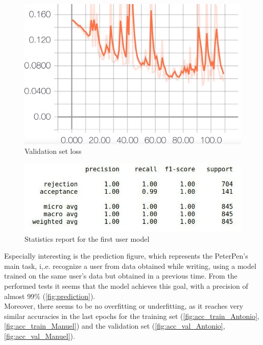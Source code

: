 \documentclass[8pt,notitlepage]{report}
\begin{document}
			\begin{figure}[H]
				\begin{center}
					\includegraphics[scale=.16]{val_loss_Manuel}
					\caption{Validation set loss}
				\end{center}
			\end{figure}
			
			\newpage			
			
			\begin{figure}[H]
				\begin{center}
					\includegraphics[scale=.4]{measures_table_LSTM}
					\caption{Statistics report for the first user model}
				\end{center}
			\end{figure}
			\newpage
			Especially interesting is the prediction figure, which represents the PeterPen's main task, i,.e. recognize a user from data obtained while writing, using a model trained on the same user's data but obtained in a previous time. From the performed tests it seems that the model achieves this goal, with a precision of almost 99\% (\cref{fig:prediction}). \\
			Moreover, there seems to be no overfitting or underfitting, as it reaches very similar accuracies in the last epochs for the training set (\cref{fig:acc_train_Antonio}, \cref{fig:acc_train_Manuel}) and the validation set (\cref{fig:acc_val_Antonio}, \cref{fig:acc_val_Manuel}).
\end{document}
